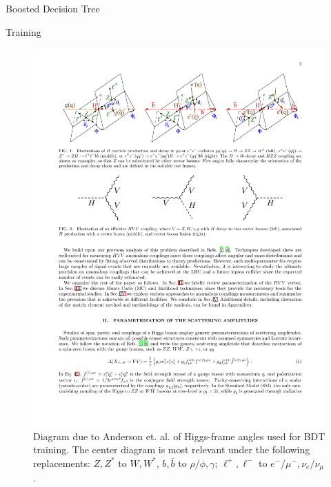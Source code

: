 \begin{section}{Boosted Decision Tree}
\begin{subsection}{Training}
\begin{figure}[htb]
\begin{center}
\includegraphics[width=.95\linewidth]{Dissertation/fig/magic-angles.pdf}
\end{center}
\caption{Diagram due to Anderson et. al. \cite{magic-angles-cite} of Higgs-frame angles used for BDT training. The center diagram is most relevant under the following replacements: $Z, Z^*$ to $W, W^*$, $b, \bar{b}$ to $\rho/\phi, \gamma$; $\ell^+,\ell^-$ to $e^-/\mu^-, \nu_e/ \nu_\mu$.}
\label{fig:magic-angles}
\end{figure}


\end{subsection}
\end{section}
